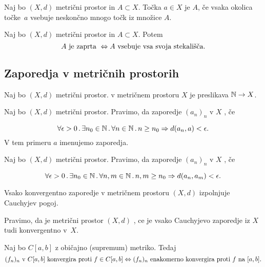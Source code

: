 \begin{definicija}
    Naj bo $(X, d)$ metrični prostor in $A \subset X$. Točka $a \in X$ je  $A$, če vsaka okolica točke~$a$ vsebuje neskončno mnogo točk iz množice $A$.
\end{definicija}

\begin{trditev}
    Naj bo $(X, d)$ metrični prostor in $A \subset X$. Potem 
    $$A \text{ je zaprta } \Leftrightarrow A \text{ vsebuje vsa svoja stekališča}.$$
\end{trditev}

\newpage
\subsection*{Zaporedja v metričnih prostorih}
\begin{definicija}
    Naj bo $(X, d)$ metrični prostor.  v metričnem prostoru $X$ je preslikava $\mathbb{N} \to X$.
\end{definicija}

\begin{definicija}
    Naj bo $(X, d)$ metrični prostor. Pravimo, da zaporedje $(a_n)_n$ v $X$ , če

    $$\forall \epsilon > 0 \,.\, \exists n_0 \in \mathbb{N} \,.\, \forall n \in \mathbb{N} \,.\, n \geq n_0 \Rightarrow d(a_n, a) < \epsilon.$$
    V tem primeru $a$ imenujemo  zaporedja.
\end{definicija}

\begin{definicija}
    Naj bo $(X, d)$ metrični prostor. Pravimo, da zaporedje $(a_n)_n$ v $X$ , če

    $$\forall \epsilon > 0 \,.\, \exists n_0 \in \mathbb{N} \,.\, \forall n, m \in \mathbb{N} \,.\, n, m \geq n_0 \Rightarrow d(a_n, a_m) < \epsilon.$$
\end{definicija}

\begin{izrek}
    Vsako konvergentno zaporedje v metričnem prostoru $(X, d)$ izpolnjuje Cauchyjev pogoj.
\end{izrek}

\begin{definicija}
    Pravimo, da je metrični prostor $(X, d)$ , ce je vsako Cauchyjevo zaporedje iz $X$ tudi konvergentno v~$X$.
\end{definicija}

\begin{izrek}
    Naj bo $C[a,b]$ z običajno (supremum) metriko. Tedaj 
    $$(f_n)_n \text{ v } C[a,b] \text{ konvergira proti } f \in C[a,b] \Leftrightarrow (f_n)_n \text{ enakomerno konvergira proti } f \text{ na } [a, b].$$
\end{izrek}

